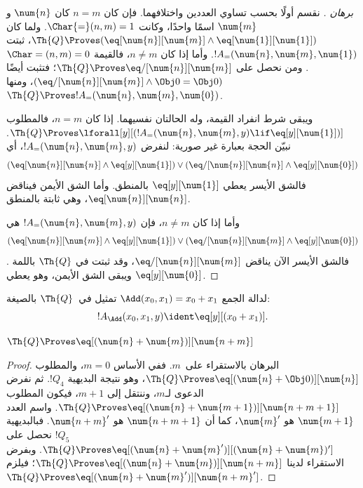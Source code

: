 \documentclass[../../../include/open-logic-section]{subfiles}
\begin{document}
\begin{proof}[برهان ]
نقسم أولًا بحسب تساوي العددين واختلافهما. فإن كان $n=m$ كان
$\num{n}$ و$\num{m}$ اسمًا واحدًا، وكانت $\Char{=}(n,m)=1$.
ولما كان
$\Th{Q}\Proves(\eq[\num{n}][\num{m}]\land\eq[\num{1}][\num{1}])$،
ثبتت $!A_=(\num{n},\num{m},\num{1})$.
وأما إذا كان $n\neq m$، فالقيمة $\Char=(n,m)=0$.
ومن  نحصل على
$\Th{Q}\Proves\eq/[\num{n}][\num{m}]$؛ فتثبت أيضًا
$(\eq/[\num{n}][\num{m}]\land\Obj 0=\Obj 0)$،
ومنها $\Th{Q}\Proves !A_=(\num{n},\num{m},\num{0})$.

ويبقى شرط انفراد القيمة، وله الحالتان نفسيهما.
إذا كان $n=m$، فالمطلوب
$\Th{Q}\Proves\lforall[y][(!A_=(\num{n},\num{m},y)
\lif\eq[y][\num{1}])]$.
نبيّن الحجة بعبارة غير صورية: لنفرض
$!A_=(\num{n},\num{m},y)$، أي
\[
(\eq[\num{n}][\num{n}] \land \eq[y][\num{1}]) \lor
(\eq/[\num{n}][\num{n}] \land \eq[y][\num{0}])
\]
فالشق الأيسر يعطي $\eq[y][\num{1}]$ بالمنطق.
وأما الشق الأيمن فيناقض $\eq[\num{n}][\num{n}]$، وهي ثابتة بالمنطق.

وأما إذا كان $n\neq m$، فإن
$!A_=(\num{n},\num{m},y)$ هي
\[
(\eq[\num{n}][\num{m}] \land \eq[y][\num{1}]) \lor
(\eq/[\num{n}][\num{m}] \land \eq[y][\num{0}])
\]
فالشق الأيسر الآن يناقض $\eq/[\num{n}][\num{m}]$، وقد ثبتت في
$\Th{Q}$ باللمة .
ويبقى الشق الأيمن، وهو يعطي $\eq[y][\num{0}]$.
\end{proof}

\begin{prop}
لدالة الجمع $\Add(x_0,x_1)=x_0+x_1$ تمثيل في~$\Th{Q}$ بالصيغة:
\[
  !A_{\Add}(x_0, x_1, y) \ident \eq[y][(x_0 + x_1)].
\]
\end{prop}

\begin{lem}
$\Th{Q} \Proves \eq[(\num{n} + \num{m})][\num{n+m}]$
\end{lem}

\begin{proof}
البرهان بالاستقراء على~$m$. ففي الأساس $m=0$،
والمطلوب $\Th{Q}\Proves\eq[(\num{n}+\Obj 0)][\num{n}]$،
وهو نتيجة البديهية $!Q_4$. ثم نفرض الدعوى لـ$m$، وننتقل إلى $m+1$،
فيكون المطلوب
$\Th{Q}\Proves\eq[(\num{n}+\num{m+1})][\num{n+m+1}]$.
واسم العدد $\num{m+1}$ هو $\num{m}'$، كما أن $\num{n+m+1}$
هو $\num{n+m}'$. فبالبديهية $!Q_5$ نحصل على
$\Th{Q}\Proves\eq[(\num{n}+\num{m}')][(\num{n}+\num{m})']$.
وبفرض الاستقراء لدينا
$\Th{Q}\Proves\eq[(\num{n}+\num{m})][\num{n+m}]$؛
فيلزم $\Th{Q}\Proves\eq[(\num{n}+\num{m}')][\num{n+m}']$.
\end{proof}
\end{document}
